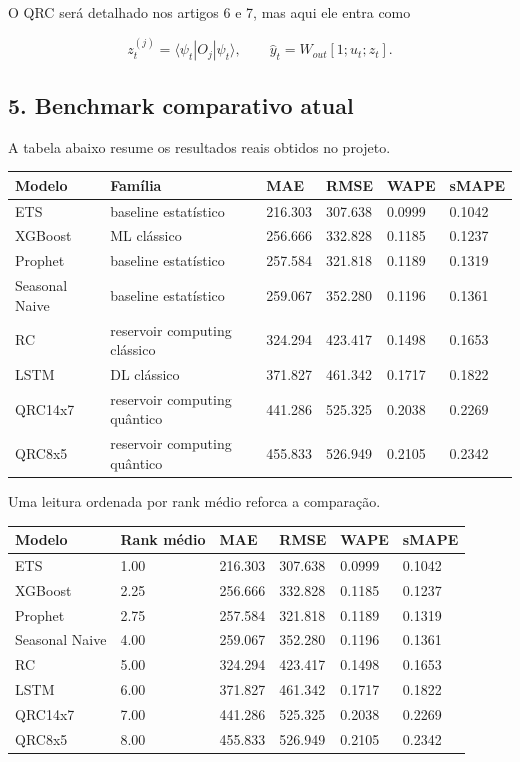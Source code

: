 \documentclass[12pt]{article}
\begin{document}
O QRC será detalhado nos artigos 6 e 7, mas aqui ele entra como

\[
z_t^{(j)} = \langle \psi_t | O_j | \psi_t \rangle,
\qquad
\hat{y}_t = W_{out} [1; u_t; z_t].
\]

\subsection{5. Benchmark comparativo atual}\label{5-benchmark-comparativo-atual}

A tabela abaixo resume os resultados reais obtidos no projeto.

\begin{longtable}[]{@{}llllll@{}}
\toprule\noalign{}
Modelo & Família & MAE & RMSE & WAPE & sMAPE \\
\midrule\noalign{}
\endhead
\bottomrule\noalign{}
\endlastfoot
ETS & baseline estatístico & 216.303 & 307.638 & 0.0999 & 0.1042 \\
XGBoost & ML clássico & 256.666 & 332.828 & 0.1185 & 0.1237 \\
Prophet & baseline estatístico & 257.584 & 321.818 & 0.1189 & 0.1319 \\
Seasonal Naive & baseline estatístico & 259.067 & 352.280 & 0.1196 & 0.1361 \\
RC & reservoir computing clássico & 324.294 & 423.417 & 0.1498 & 0.1653 \\
LSTM & DL clássico & 371.827 & 461.342 & 0.1717 & 0.1822 \\
QRC14x7 & reservoir computing quântico & 441.286 & 525.325 & 0.2038 & 0.2269 \\
QRC8x5 & reservoir computing quântico & 455.833 & 526.949 & 0.2105 & 0.2342 \\
\end{longtable}

Uma leitura ordenada por rank médio reforca a comparação.

\begin{longtable}[]{@{}llllll@{}}
\toprule\noalign{}
Modelo & Rank médio & MAE & RMSE & WAPE & sMAPE \\
\midrule\noalign{}
\endhead
\bottomrule\noalign{}
\endlastfoot
ETS & 1.00 & 216.303 & 307.638 & 0.0999 & 0.1042 \\
XGBoost & 2.25 & 256.666 & 332.828 & 0.1185 & 0.1237 \\
Prophet & 2.75 & 257.584 & 321.818 & 0.1189 & 0.1319 \\
Seasonal Naive & 4.00 & 259.067 & 352.280 & 0.1196 & 0.1361 \\
RC & 5.00 & 324.294 & 423.417 & 0.1498 & 0.1653 \\
LSTM & 6.00 & 371.827 & 461.342 & 0.1717 & 0.1822 \\
QRC14x7 & 7.00 & 441.286 & 525.325 & 0.2038 & 0.2269 \\
QRC8x5 & 8.00 & 455.833 & 526.949 & 0.2105 & 0.2342 \\
\end{longtable}
\end{document}
